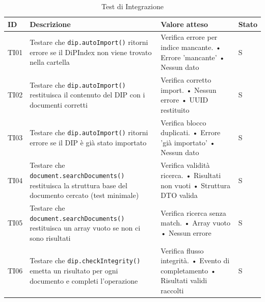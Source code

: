 \documentclass[a4paper,12pt]{article}
\begin{document}
        \begin{longtable}{|M{1.2cm}|M{6.3cm}|M{5cm}|M{1.5cm}|}
                
            \caption{Test di Integrazione} \\
            \hline
            \textbf{ID} & \textbf{Descrizione} & \textbf{Valore atteso} & \textbf{Stato} \\
            \hline
            \endhead

            TI01 & Testare che \texttt{dip.autoImport()} ritorni errore se il DiPIndex non viene trovato nella cartella & Verifica errore per indice mancante. \newline • Errore 'mancante' \newline • Nessun dato & S \\ \hline

            TI02 & Testare che \texttt{dip.autoImport()} restituisca il contenuto del DIP con i documenti corretti & Verifica corretto import. \newline • Nessun errore \newline • UUID restituito & S \\ \hline
            
            TI03 & Testare che \texttt{dip.autoImport()} ritorni errore se il DIP è già stato importato & Verifica blocco duplicati. \newline • Errore 'già importato' \newline • Nessun dato & S \\ \hline
            
            TI04 & Testare che \texttt{document.searchDocuments()} restituisca la struttura base del documento cercato (test minimale) & Verifica validità ricerca. \newline • Risultati non vuoti \newline • Struttura DTO valida & S \\ \hline
            
            TI05 & Testare che \texttt{document.searchDocuments()} restituisca un array vuoto se non ci sono risultati & Verifica ricerca senza match. \newline • Array vuoto \newline • Nessun errore & S \\ \hline
            
            TI06 & Testare che \texttt{dip.checkIntegrity()} emetta un risultato per ogni documento e completi l'operazione & Verifica flusso integrità. \newline • Evento di completamento \newline • Risultati validi raccolti & S \\ \hline
            

\end{longtable}
\end{document}
